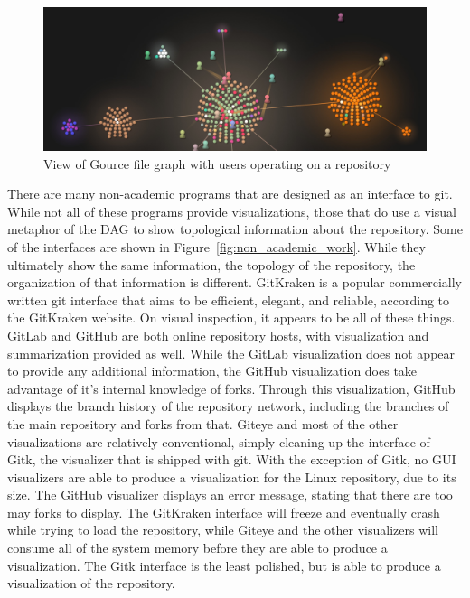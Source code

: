 \begin{figure}[htpb]
  \centering
  \includegraphics[width=0.8\linewidth]{./Figures/introduction/gource-linux.jpg}
  \caption{View of Gource file graph with users operating on a
    repository}
  \label{fig:gource_view}
\end{figure}

There are many non-academic programs that are designed as an interface
to git. While not all of these programs provide visualizations, those
that do use a visual metaphor of the DAG to show topological information
about the repository. Some of the interfaces are shown in
Figure~\ref{fig:non_academic_work}. While they ultimately show the same
information, the topology of the repository, the organization of that
information is different. GitKraken is a popular commercially written
git interface that aims to be efficient, elegant, and reliable,
according to the GitKraken website. On visual inspection, it appears to
be all of these things. GitLab and GitHub are both online repository
hosts, with visualization and summarization provided as well. While the
GitLab visualization does not appear to provide any additional
information, the GitHub visualization does take advantage of it's
internal knowledge of forks. Through this visualization, GitHub displays
the branch history of the repository network, including the branches of
the main repository and forks from that. Giteye and most of the other
visualizations are relatively conventional, simply cleaning up the
interface of Gitk, the visualizer that is shipped with git. With the
exception of Gitk, no GUI visualizers are able to produce a
visualization for the Linux repository, due to its size. The GitHub
visualizer displays an error message, stating that there are too may
forks to display. The GitKraken interface will freeze and eventually
crash while trying to load the repository, while Giteye and the other
visualizers will consume all of the system memory before they are able
to produce a visualization. The Gitk interface is the least polished,
but is able to produce a visualization of the repository.

